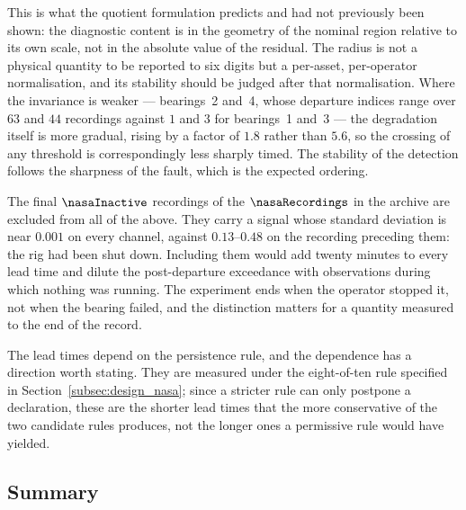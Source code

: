 \documentclass[a4paper]{cas-sc}
\begin{document}
This is what the quotient formulation predicts and had not previously been
shown: the diagnostic content is in the geometry of the nominal region
relative to its own scale, not in the absolute value of the residual. The
radius is not a physical quantity to be reported to six digits but a
per-asset, per-operator normalisation, and its stability should be judged
after that normalisation. Where the invariance is weaker --- bearings~2 and~4,
whose departure indices range over \(63\) and \(44\) recordings against \(1\)
and \(3\) for bearings~1 and~3 --- the degradation itself is more gradual,
rising by a factor of \(1.8\) rather than \(5.6\), so the crossing of any
threshold is correspondingly less sharply timed. The stability of the
detection follows the sharpness of the fault, which is the expected ordering.

The final \(\nasaInactive\) recordings of the \(\nasaRecordings\) in the
archive are excluded from all of the above. They carry a signal whose standard
deviation is near \(0.001\) on every channel, against \(0.13\)--\(0.48\)
on the recording preceding them: the rig had been shut down. Including them
would add twenty minutes to every lead time and dilute the post-departure
exceedance with observations during which nothing was running. The experiment
ends when the operator stopped it, not when the bearing failed, and the
distinction matters for a quantity measured to the end of the record.

The lead times depend on the persistence rule, and the dependence has a
direction worth stating. They are measured under the eight-of-ten rule
specified in Section~\ref{subsec:design_nasa}; since a stricter rule can only
postpone a declaration, these are the shorter lead times that the more
conservative of the two candidate rules produces, not the longer ones a
permissive rule would have yielded.

\subsection{Summary}
\label{subsec:results_summary}
\end{document}
